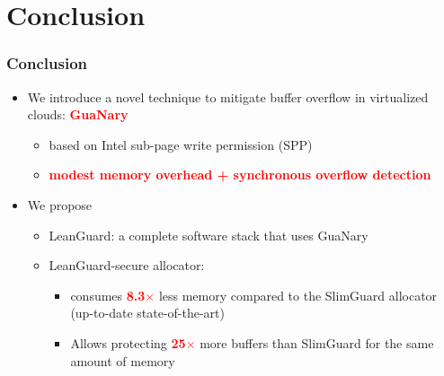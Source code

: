 \documentclass[xcolor=table,bigger,unknownkeysallowed]{beamer}
\newcommand{\myemph}[1]{\textcolor{red}{\bf #1}}
\begin{document}
\section{Conclusion}
\begin{frame}
\thispagestyle{empty}
\frametitle{Conclusion}	
	\begin{itemize}
		\item We introduce a novel technique to mitigate buffer overflow in virtualized clouds: \myemph{GuaNary}
		\begin{itemize}
			\item based on Intel sub-page write permission (SPP)
			\item \myemph{modest memory overhead + synchronous overflow detection}
		\end{itemize}
		\item We propose
		\begin{itemize}
			\item LeanGuard: a complete software stack that uses GuaNary
			\item LeanGuard-secure allocator: 
			\begin{itemize}
				\item consumes \myemph{8.3$\times$} less memory compared to the SlimGuard allocator (up-to-date state-of-the-art)
				\item Allows protecting \myemph{25$\times$} more buffers than SlimGuard for the same amount of memory
			\end{itemize}
		\end{itemize}
	\end{itemize}			
\end{frame} 

\end{document}
